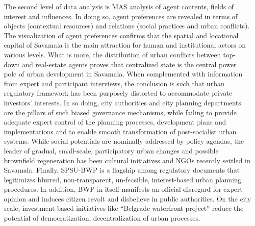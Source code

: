 \documentclass[11pt]{report}
\begin{document}
The second level of data analysis is MAS analysis of agent contents, fields of interest and influences. In doing so, agent preferences are revealed in terms of objects (contextual resources) and relations (social practices and urban conflicts). The visualization of agent preferences confirms that the spatial and locational capital of Savamala is the main attraction for human and institutional actors on various levels. What is more, the distribution of urban conflicts between top-down and real-estate agents proves that centralized state is the central power pole of urban development in Savamala. When complemented with information from expert and participant interviews, the conclusion is such that urban regulatory framework has been purposely distorted to accommodate private investors’ interests. In so doing, city authorities and city planning departments are the pillars of such biased governance mechanisms, while failing to provide adequate expert control of the planning processes, development plans and implementations and to enable smooth transformation of post-socialist urban systems. While social potentials are nominally addressed by policy agendas, the leader of gradual, small-scale, participatory urban changes and possible brownfield regeneration has been cultural initiatives and NGOs recently settled in Savamala. Finally, SPSU-BWP is a flagship among regulatory documents that legitimizes blurred, non-transparent, un-feasible, interest-based urban planning procedures. In addition, BWP in itself manifests an official disregard for expert opinion and induces citizen revolt and disbelieve in public authorities. On the city scale, investment-based initiatives like “Belgrade waterfront project” reduce the potential of democratization, decentralization of urban processes.
\end{document}
